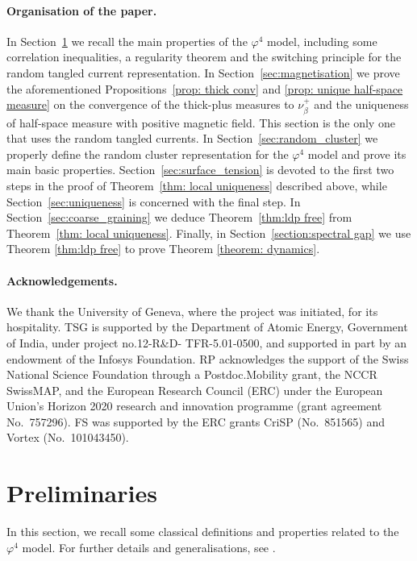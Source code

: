 \documentclass[11pt,a4paper]{article}
\theoremstyle{definition}
\numberwithin{equation}{section}
\begin{document}
\paragraph{Organisation of the paper.} In Section~\ref{sec:preliminaries} we recall the main properties of the $\varphi^4$ model, including some correlation inequalities, a regularity theorem and the switching principle for the random tangled current representation. In Section~\ref{sec:magnetisation} we prove the aforementioned Propositions~\ref{prop: thick conv} and \ref{prop: unique half-space measure} on the convergence of the thick-plus measures to $\nu^+_\beta$ and the uniqueness of half-space measure with positive magnetic field. This section is the only one that uses the random tangled currents. In Section~\ref{sec:random_cluster} we properly define the random cluster representation for the $\varphi^4$ model and prove its main basic properties. Section~\ref{sec:surface_tension} is devoted to the first two steps in the proof of Theorem~\ref{thm: local uniqueness} described above, while Section~\ref{sec:uniqueness} is concerned with the final step. In Section~\ref{sec:coarse_graining} we deduce Theorem~\ref{thm:ldp free} from Theorem~\ref{thm: local uniqueness}. Finally, in Section~\ref{section:spectral gap} we use Theorem \ref{thm:ldp free} to prove Theorem \ref{theorem: dynamics}.


\paragraph{Acknowledgements.} We thank the University of Geneva, where the project was initiated, for its hospitality. TSG is supported by the Department of Atomic Energy, Government of India, under project no.12-R\&D-
TFR-5.01-0500, and supported in part by an endowment of the Infosys Foundation. RP acknowledges the support of the Swiss National Science Foundation through a Postdoc.Mobility grant, the NCCR SwissMAP, and the European Research Council (ERC) under the European Union’s Horizon 2020 research and innovation programme (grant agreement No.\ 757296). FS was supported by the ERC grants CriSP (No.\ 851565) and Vortex (No.\ 101043450).




\section{Preliminaries}\label{sec:preliminaries}
In this section, we recall some classical definitions and properties related to the $\varphi^4$ model. For further details and generalisations, see \cite{GunaratnamPanagiotisPanisSeveroPhi42022}. 
\end{document}
